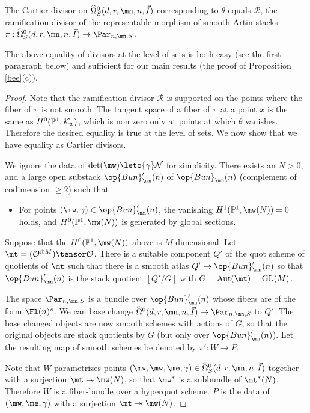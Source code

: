 \begin{proposition}
\notready\label{torro}
The Cartier divisor on $\widehat{\Omega}^0_S(d,r,\mn,n,\vec{I})$  corresponding to $\theta$ equals $\mathcal{R}$, the ramification divisor of the representable morphism of smooth Artin stacks $\pi:\widehat{\Omega}^0_S(d,r,\mn,n,\vec{I})\to \Par_{n,\mn,S}$.
\end{proposition}
The above equality of divisors at the level of sets is both easy (see the first paragraph below) and sufficient for our main results (the proof of Proposition \ref{bee}(c)).
 \begin{proof}
 Note that the ramification divisor $\mathcal{R}$ is supported on the points where the fiber of $\pi$ is not smooth. The tangent space of a fiber of $\pi$ at a point $x$ is the same as $H^0(\Bbb{P}^1,\mathcal{K}_x)$, which is non zero only at points at which $\theta$ vanishes. Therefore the desired equality is true at the level of sets. We now show that we have equality as Cartier divisors.

 We ignore the data of $\det(\mw)\leto{\gamma}\mathcal{N}$ for simplicity. There exists an $N>0$, and a large open substack $\op{Bun}'_{\mn}(n)$ of $\op{Bun}_{\mn}(n)$ (complement of codimension $\geq 2$) such that
\begin{itemize}
\item[-] For points $(\mw,\gamma)\in \op{Bun}'_{\mn}(n)$, the vanishing $H^1(\Bbb{P}^1,\mw(N))=0$ holds, and $H^0(\Bbb{P}^1,\mw(N))$ is generated by global sections.
\end{itemize}
 Suppose that the $H^0(\Bbb{P}^1,\mw(N))$  above is $M$-dimensional. Let $\mt=(\mathcal{O}^{\oplus M})\tensor \mathcal{O}$. There is a suitable component $Q'$ of the quot scheme of quotients of $\mt$ such that there is a smooth atlas $Q'\to \op{Bun}'_{\mn}(n)$ so that $\op{Bun}'_{\mn}(n)$ is the stack quotient
$[Q'/G]$ with $G= \operatorname{Aut}(\mt)=\operatorname{GL}(M)$.

The space $\Par_{n,\mn,S}$ is a bundle over $\op{Bun}'_{\mn}(n)$ whose fibers are of the form $\Fl(n)^s$. We can base change  $\widehat{\Omega}^0(d,r,\mn,n,\vec{I})\to \Par_{n,\mn,S}$ to $Q'$. The base changed objects are now smooth schemes with actions of $G$, so that the original objects are stack quotients by $G$ (but only over $\op{Bun}'_{\mn}(n)$). Let the resulting map of smooth schemes be denoted by $\pi':W\to P$.

Note that $W$ parametrizes points $(\mv,\mw,\me,\gamma)\in \widehat{\Omega}^0_S(d,r,\mn,n,\vec{I})$ together with a surjection $\mt\twoheadrightarrow  \mw(N)$, so that $\mw^*$ is a subbundle of $\mt^*(N)$. Therefore $W$ is a fiber-bundle over a hyperquot scheme. $P$ is the data of $(\mw,\me,\gamma)$  with a surjection $\mt\twoheadrightarrow \mw(N)$.



\end{proof}
